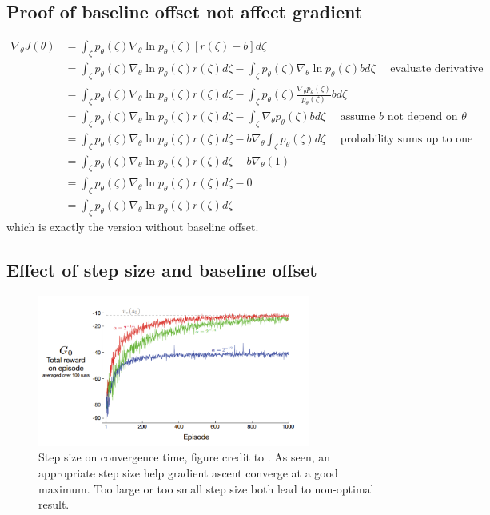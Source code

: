 \documentclass[11pt]{article}
\begin{document}
\subsection{Proof of baseline offset not affect gradient}
\begin{align*}
\nabla_{\theta} J(\theta) &=\int_{\zeta} p_{\theta}(\zeta) \nabla_{\theta} \ln p_{\theta}(\zeta)[r(\zeta)-b] d \zeta  \\
&=\int_{\zeta} p_{\theta}(\zeta) \nabla_{\theta} \ln p_{\theta}(\zeta) r(\zeta) d \zeta-\int_{\zeta} p_{\theta}(\zeta) \nabla_{\theta} \ln p_{\theta}(\zeta) b d \zeta \quad \text { evaluate derivative }\\
&=\int_{\zeta} p_{\theta}(\zeta) \nabla_{\theta} \ln p_{\theta}(\zeta) r(\zeta) d \zeta-\int_{\zeta} p_{\theta}(\zeta) \frac{\nabla_{\theta} p_{\theta}(\zeta)}{p_{\theta}(\zeta)} b d \zeta \\
&=\int_{\zeta} p_{\theta}(\zeta) \nabla_{\theta} \ln p_{\theta}(\zeta) r(\zeta) d \zeta-\int_{\zeta} \nabla_{\theta} p_{\theta}(\zeta) b d \zeta \quad \text { assume $b$ not depend on $\theta$ }\\
&=\int_{\zeta} p_{\theta}(\zeta) \nabla_{\theta} \ln p_{\theta}(\zeta) r(\zeta) d \zeta-b \nabla_{\theta} \int_{\zeta} p_{\theta}(\zeta) d \zeta \quad \text { probability sums up to one } \\
&=\int_{\zeta} p_{\theta}(\zeta) \nabla_{\theta} \ln p_{\theta}(\zeta) r(\zeta) d \zeta-b \nabla_{\theta}(1)  \\
&=\int_{\zeta} p_{\theta}(\zeta) \nabla_{\theta} \ln p_{\theta}(\zeta) r(\zeta) d \zeta-0 \\
&=\int_{\zeta} p_{\theta}(\zeta) \nabla_{\theta} \ln p_{\theta}(\zeta) r(\zeta) d \zeta
\end{align*}
which is exactly the version without baseline offset.

\subsection{Effect of step size and baseline offset}
\begin{figure}[H]
    \centering
    \includegraphics[width=0.8\textwidth]{step_size.png}
    \caption{Step size on convergence time, figure credit to \cite{sutton2018reinforcement}. As seen, an appropriate step size help gradient ascent converge at a good maximum. Too large or too small step size both lead to non-optimal result.}
    \label{fig:my_label}
\end{figure}
\end{document}
